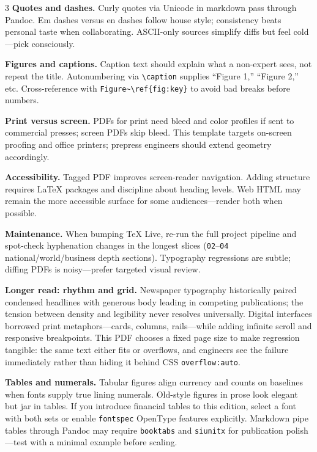 \documentclass[
]{article}
\begin{document}
\begin{multicols}{3}
\textbf{Quotes and dashes.} Curly quotes via Unicode in markdown pass
through Pandoc. Em dashes versus en dashes follow house style;
consistency beats personal taste when collaborating. ASCII-only sources
simplify diffs but feel cold---pick consciously.

\textbf{Figures and captions.} Caption text should explain what a
non-expert sees, not repeat the title. Autonumbering via
\texttt{\textbackslash{}caption} supplies ``Figure 1,'' ``Figure 2,''
etc. Cross-reference with
\texttt{Figure\textasciitilde{}\textbackslash{}ref\{fig:key\}} to avoid
bad breaks before numbers.

\textbf{Print versus screen.} PDFs for print need bleed and color
profiles if sent to commercial presses; screen PDFs skip bleed. This
template targets on-screen proofing and office printers; prepress
engineers should extend geometry accordingly.

\textbf{Accessibility.} Tagged PDF improves screen-reader navigation.
Adding structure requires LaTeX packages and discipline about heading
levels. Web HTML may remain the more accessible surface for some
audiences---render both when possible.

\textbf{Maintenance.} When bumping TeX Live, re-run the full project
pipeline and spot-check hyphenation changes in the longest slices
(\texttt{02}--\texttt{04} national/world/business depth sections).
Typography regressions are subtle; diffing PDFs is noisy---prefer
targeted visual review.

\textbf{Longer read: rhythm and grid.} Newspaper typography historically
paired condensed headlines with generous body leading in competing
publications; the tension between density and legibility never resolves
universally. Digital interfaces borrowed print metaphors---cards,
columns, rails---while adding infinite scroll and responsive
breakpoints. This PDF chooses a fixed page size to make regression
tangible: the same text either fits or overflows, and engineers see the
failure immediately rather than hiding it behind CSS
\texttt{overflow:auto}.

\textbf{Tables and numerals.} Tabular figures align currency and counts
on baselines when fonts supply true lining numerals. Old-style figures
in prose look elegant but jar in tables. If you introduce financial
tables to this edition, select a font with both sets or enable
\texttt{fontspec} OpenType features explicitly. Markdown pipe tables
through Pandoc may require \texttt{booktabs} and \texttt{siunitx} for
publication polish---test with a minimal example before scaling.


\end{multicols}
\end{document}
